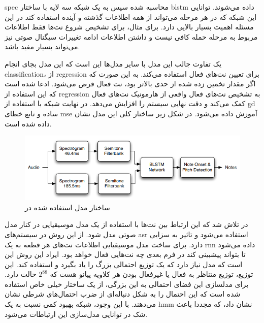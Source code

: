 \gls{spec} محاسبه شده سپس به یک شبکه سه لایه با ساختار \gls{blstm} داده می‌شوند.
توانایی این شبکه که در هر مرحله می‌تواند از همه اطلاعات گذشته و آینده استفاده
کند در این مسئله اهمیت بسیار بالایی دارد. برای مثال، برای تشخیص شروع نت‌ها فقط
اطلاعات مربوط به مرحله حمله کافی نیست و داشتن اطلاعات ادامه تغییرات سیگنال صوتی
نیز می‌تواند بسیار مفید باشد.

یک تفاوت جالب این مدل با سایر مدل‌ها این است که این مدل بجای انجام
\gls{classification}، از \gls{regression} برای تعیین نت‌های فعال استفاده می‌کند.
به این صورت که اگر مقدار تخمین زده شده از حدی بالاتر بود، نت فعال فرض می‌شود.
ادعا شده است که این استفاده از \gls{regression} به تشخیص نت‌های فعال واقعی از
هارمونیک نت‌های فعال کمک می‌کند و دقت نهایی سیستم را افزایش می‌دهد. در نهایت
شبکه با استفاده از \gls{gd} ساده و تابع خطای \gls{mse} آموزش داده می‌شود. در شکل
زیر ساختار کلی این مدل نشان داده شده است.
\begin{figure}[ht]
    \centering
    \includegraphics[width=12cm]{./statics/bock2012polyphonic_architecture.png}
    \caption{ساختار مدل استفاده شده در \cite{bock2012polyphonic}}
\end{figure}

در \cite{sigtia2016end} تلاش شد که این ارتباط بین نت‌ها با استفاده از یک مدل
موسیقیایی در کنار مدل صوتی مدل شود. از این روش در سیستم‌های \gls{asr} استفاده
می‌شود و تاثیر به سزایی دارد. برای ساخت مدل موسیقیایی اطلاعات نت‌های هر قطعه به
یک \gls{rnn} داده می‌شود تا بتواند پیشبینی کند در فرم بعدی چه نت‌هایی فعال خواهد
بود. ایراد این روش این است که مدل نیاز دارد که یک توزیع احتمالی بزرگ را یاد
بگیرد و استفاده کند. این توزیع، توزیع متناظر به فعال یا غیرفعال بودن هر کلاویه
پیانو هست که $2^{88}$ حالت دارد. برای مدلسازی این فضای احتمالی به این بزرگی، از
یک ساختار خیلی خاص استفاده شده است که این احتمال را به شکل دنباله‌ای از ضرب
احتمال‌های شرطی نشان می‌دهند. با این وجود، شبکه بهبود کمی نسبت به یک \gls{hmm}
نشان داد، که مجددا باعث شک در توانایی مدل‌سازی این ارتباطات می‌شود.

